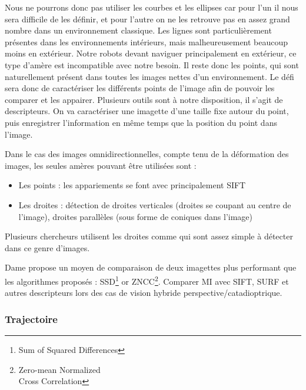 Nous ne pourrons donc pas utiliser les courbes et les ellipses car pour l'un il nous sera difficile de les définir, et pour l'autre on ne les retrouve pas en assez grand nombre dans un environnement classique.
Les lignes sont particulièrement présentes dans les environnements intérieurs, mais malheureusement beaucoup moins en extérieur.
Notre robots devant naviguer principalement en extérieur, ce type d'amère est incompatible avec notre besoin.
Il reste donc les points, qui sont naturellement présent dans toutes les images nettes d'un environnement.
Le défi sera donc de caractériser les différents points de l'image afin de pouvoir les comparer et les appairer.
Plusieurs outils sont à notre disposition, il s'agit de descripteurs.
On va caractériser une imagette d'une taille fixe autour du point, puis enregistrer l'information en même temps que la position du point dans l'image.


Dans le cas des images omnidirectionnelles, compte tenu de la déformation des images, les seules amères pouvant être utilisées sont :
\begin{itemize}
\item Les points : les appariements se font avec principalement SIFT
\item Les droites : détection de droites verticales (droites se coupant au centre de l'image), droites parallèles (sous forme de coniques dans l'image)
\end{itemize}

Plusieurs chercheurs utilisent les droites comme \cite{Goedeme07} qui  sont assez simple à détecter dans ce genre d'images.


Dame \cite{Dame10PhD} propose un moyen de comparaison de deux imagettes plus performant que les algorithmes proposés : SSD\footnote{Sum of Squared Differences} or ZNCC\footnote{Zero-mean Normalized\\Cross Correlation}.
Comparer MI avec SIFT, SURF et autres descripteurs lors des cas de vision hybride perspective/catadioptrique.  

\subsubsection{Trajectoire}

